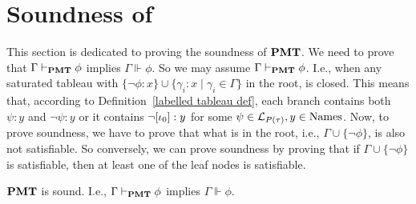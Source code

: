 \section{Soundness of \pmt}\label{soundness section}

\par This section is dedicated to proving the soundness of $\textbf{PMT}$. We need to prove that $\Gamma \vdash_{\textbf{PMT}} \phi$ implies $\Gamma\Vdash \phi$. So we may assume $\Gamma \vdash_{\textbf{PMT}} \phi$. I.e., when any saturated tableau with $\{\neg\phi:x\}\cup\{\gamma_i:x\mid\gamma_i\in\Gamma\}$ in the root, is closed. This means that, according to Definition~\ref{labelled tableau def}, each branch contains both $\psi:y$ and $\neg\psi:y$ or it contains $\neg[{\iota_{0}}]:y$ for some $\psi\in\mathcal{L}_{P(\tau)}, y\in\text{Names}$. Now, to prove soundness, we have to prove that what is in the root, i.e., $\Gamma \cup \{\neg \phi\}$, is also not satisfiable. So conversely, we can prove soundness by proving that if $\Gamma \cup \{\neg \phi\}$ is satisfiable, then at least one of the leaf nodes is satisfiable.


\begin{theorem}\label{Soundness of PMT - theorem}
    $\textbf{PMT}$ is sound. I.e., $\Gamma \vdash_{\textbf{PMT}} \phi$ implies $\Gamma\Vdash \phi$.
\end{theorem}

